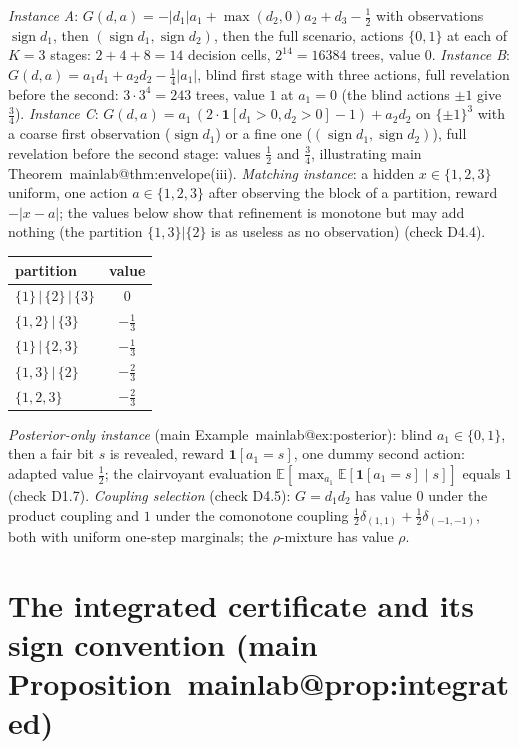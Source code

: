 \documentclass[11pt,a4paper]{article}
\makeatletter
\theoremstyle{plain}
\theoremstyle{definition}
\theoremstyle{remark}
\newcommand{\E}{\mathbb{E}}
\newcommand{\ind}[1]{\mathbf{1}[#1]}
\newcommand{\tfr}[2]{\tfrac{#1}{#2}}
\newcommand{\mref}[1]{\csname mainlab@#1\endcsname}
\makeatother
\begin{document}
\emph{Instance A}: $G(d,a)=-|d_1|a_1+\max(d_2,0)a_2+d_3-\tfr12$ with observations $\operatorname{sign}d_1$, then $(\operatorname{sign}d_1,\operatorname{sign}d_2)$, then the full scenario, actions $\{0,1\}$ at each of $K=3$ stages: $2+4+8=14$ decision cells, $2^{14}=16384$ trees, value $0$. \emph{Instance B}: $G(d,a)=a_1d_1+a_2d_2-\tfr14|a_1|$, blind first stage with three actions, full revelation before the second: $3\cdot3^4=243$ trees, value $1$ at $a_1=0$ (the blind actions $\pm1$ give $\tfr34$). \emph{Instance C}: $G(d,a)=a_1\,(2\cdot\ind{d_1>0,d_2>0}-1)+a_2d_2$ on $\{\pm1\}^3$ with a coarse first observation ($\operatorname{sign}d_1$) or a fine one ($(\operatorname{sign}d_1,\operatorname{sign}d_2)$), full revelation before the second stage: values $\tfr12$ and $\tfr34$, illustrating main Theorem~\mref{thm:envelope}(iii). \emph{Matching instance}: a hidden $x\in\{1,2,3\}$ uniform, one action $a\in\{1,2,3\}$ after observing the block of a partition, reward $-|x-a|$; the values below show that refinement is monotone but may add nothing (the partition $\{1,3\}|\{2\}$ is as useless as no observation) (check D4.4).
\begin{center}\small
\begin{tabular}{lc}
\toprule
partition & value\\
\midrule
$\{1\}\,|\,\{2\}\,|\,\{3\}$ & $0$\\
$\{1,2\}\,|\,\{3\}$ & $-\tfrac{1}{3}$\\
$\{1\}\,|\,\{2,3\}$ & $-\tfrac{1}{3}$\\
$\{1,3\}\,|\,\{2\}$ & $-\tfrac{2}{3}$\\
$\{1,2,3\}$ & $-\tfrac{2}{3}$\\
\bottomrule
\end{tabular}
\end{center}
\emph{Posterior-only instance} (main Example~\mref{ex:posterior}): blind $a_1\in\{0,1\}$, then a fair bit $s$ is revealed, reward $\ind{a_1=s}$, one dummy second action: adapted value $\tfr12$; the clairvoyant evaluation $\E[\max_{a_1}\E[\ind{a_1=s}\mid s]]$ equals $1$ (check D1.7). \emph{Coupling selection} (check D4.5): $G=d_1d_2$ has value $0$ under the product coupling and $1$ under the comonotone coupling $\tfr12\delta_{(1,1)}+\tfr12\delta_{(-1,-1)}$, both with uniform one-step marginals; the $\rho$-mixture has value $\rho$.
\section{The integrated certificate and its sign convention (main Proposition~\mref{prop:integrated})}\label{si:integrated}
\end{document}
